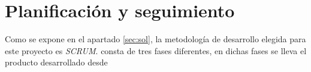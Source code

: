 \section{Planificación y seguimiento} \label{sec:plan}
    
    Como se expone en el apartado \ref{sec:sol}, la metodología de desarrollo elegida para este proyecto es \textit{SCRUM}.  consta de tres fases diferentes, en dichas fases se lleva el producto desarrollado desde 